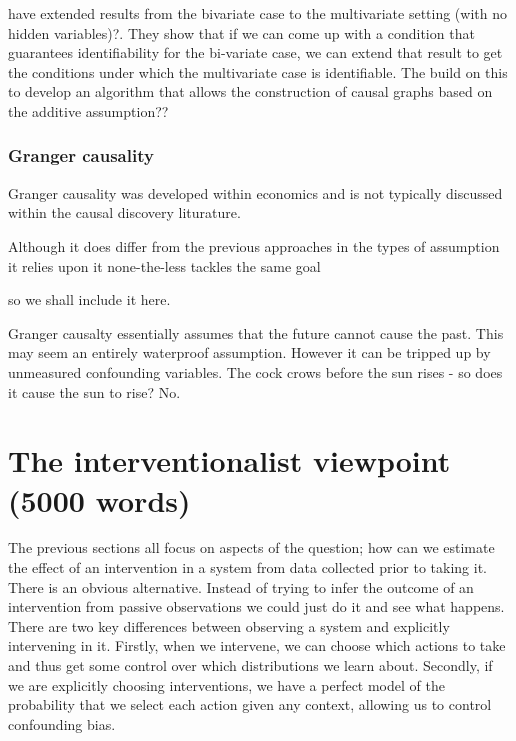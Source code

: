 \documentclass[11pt,a4paper,oneside]{book}
\begin{document}
\citep{Peters2014} have extended results from the bivariate case to the multivariate setting (with no hidden variables)?. They show that if we can come up with a condition that guarantees identifiability for the bi-variate case, we can extend that result to get the conditions under which the multivariate case is identifiable. The build on this to develop an algorithm that allows the construction of causal graphs based on the additive assumption??

\subsection*{Granger causality}

Granger causality was developed within economics and is not typically discussed within the causal discovery liturature.  

Although it does differ from the previous approaches in the types of assumption it relies upon it none-the-less tackles the same goal 

so we shall include it here. 

Granger causalty essentially assumes that the future cannot cause the past. This may seem an entirely waterproof assumption. However it can be tripped up by unmeasured confounding variables. The cock crows before the sun rises - so does it cause the sun to rise? No. 



\chapter*{The interventionalist viewpoint (5000 words)}

The previous sections all focus on aspects of the question; how can we estimate the effect of an intervention in a system from data collected prior to taking it. There is an obvious alternative. Instead of trying to infer the outcome of an intervention from passive observations we could just do it and see what happens. There are two key differences between observing a system and explicitly intervening in it. Firstly, when we intervene, we can choose which actions to take and thus get some control over which distributions we learn about. Secondly, if we are explicitly choosing interventions, we have a perfect model of the probability that we select each action given any context, allowing us to control confounding bias. 
\end{document}
